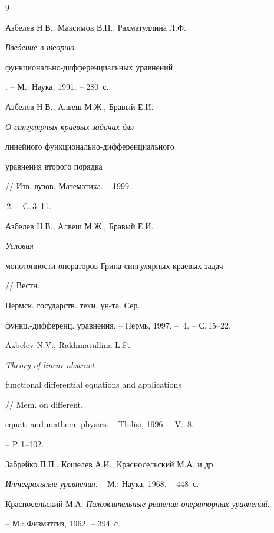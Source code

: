 \begin{thebibliography}{9}







Азбелев Н.В., Максимов В.П., Рахматуллина Л.Ф. {\em Введение в теорию


функционально-дифференциальных уравнений}. -- М.: Наука, 1991. -- 280~с.




Азбелев Н.В., Алвеш М.Ж., Бравый Е.И.


{\em О сингулярных краевых задачах для


линейного функционально-дифференциального


уравнения второго порядка} // Изв. вузов. Математика. -- 1999. --


\No\,2. -- C.\,3--11.




Азбелев Н.В., Алвеш М.Ж., Бравый Е.И. {\em Условия


монотонности операторов Грина сингулярных краевых задач} // Вестн.


Пермск. государств. техн. ун-та. Сер.


функц.-дифференц. уравнения. -- Пермь, 1997. -- \No\,4. -- С.\,15--22.







Azbelev N.V., Rakhmatullina L.F. {\em Theory of linear abstract


functional differential equations and applications} // Mem. on different.


equat. and mathem. physics. -- Tbilisi, 1996. -- V.~8.


-- P.\,1--102.







Забрейко П.П., Кошелев А.И., Красносельский М.А. и др.


{\em Интегральные уравнения}. -- М.: Наука, 1968. -- 448~с.







Красносельский М.А. {\em Положительные решения операторных уравнений}.


-- М.: Физматгиз, 1962. -- 394~с.





\end{thebibliography}





\vskip 2cm









\label{end}











